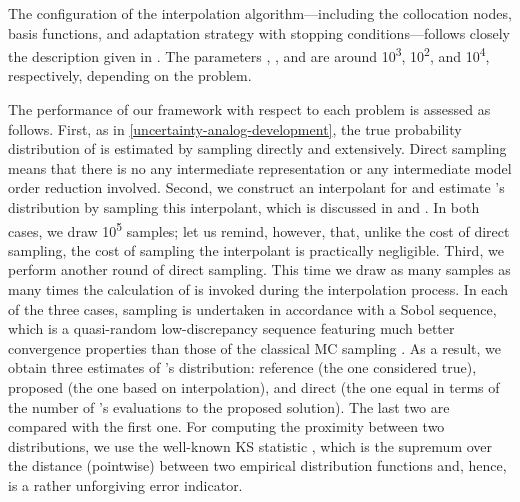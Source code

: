 The configuration of the interpolation algorithm---including the collocation
nodes, basis functions, and adaptation strategy with stopping
conditions---follows closely the description given in .
The parameters , , and  are around
10\textsuperscript{3}, 10\textsuperscript{2}, and 10\textsuperscript{4},
respectively, depending on the problem.

The performance of our framework with respect to each problem is assessed as
follows. First, as in \cref{uncertainty-analog-development}, the true
probability distribution of \g is estimated by sampling \g directly and
extensively. Direct sampling means that there is no any intermediate
representation or any intermediate model order reduction involved. Second, we
construct an interpolant for \g and estimate \g's distribution by sampling this
interpolant, which is discussed in  and
. In both cases, we draw 10\textsuperscript{5} samples;
let us remind, however, that, unlike the cost of direct sampling, the cost of
sampling the interpolant is practically negligible. Third, we perform another
round of direct sampling. This time we draw as many samples as many times the
calculation of \g is invoked during the interpolation process. In each of the
three cases, sampling is undertaken in accordance with a Sobol sequence, which
is a quasi-random low-discrepancy sequence featuring much better convergence
properties than those of the classical \ac{MC} sampling \cite{joe2008}. As a
result, we obtain three estimates of \g's distribution: reference (the one
considered true), proposed (the one based on interpolation), and direct (the one
equal in terms of the number of \g's evaluations to the proposed solution). The
last two are compared with the first one. For computing the proximity between
two distributions, we use the well-known \ac{KS} statistic \cite{rao2002}, which
is the supremum over the distance (pointwise) between two empirical distribution
functions and, hence, is a rather unforgiving error indicator.

